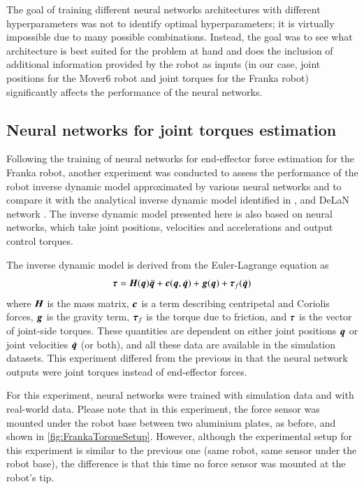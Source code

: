 The goal of training different neural networks architectures with different hyperparameters was not to identify optimal hyperparameters; it is virtually impossible due to many possible combinations. Instead, the goal was to see what architecture is best suited for the problem at hand and does the inclusion of additional information provided by the robot as inputs (in our case, joint positions for the Mover6 robot and joint torques for the Franka robot) significantly affects the performance of the neural networks.

\subsection{Neural networks for joint torques estimation}

Following the training of neural networks for end-effector force estimation for the Franka robot, another experiment was conducted to assess the performance of the robot inverse dynamic model approximated by various neural networks and to compare it with the analytical inverse dynamic model identified in \cite{Gaz2019}, and DeLaN network \cite{Lutter2019}. The inverse dynamic model presented here is also based on neural networks, which take joint positions, velocities and accelerations and output control torques.

The inverse dynamic model is derived from the Euler-Lagrange equation as
\[
    {\bm{\tau}}={\bm{H}}({\bm{q}})\ddot{{\bm{q}}}+{\bm{c}}({\bm{q}},\dot{{\bm{q}}})+{\bm{g}}({\bm{q}})+{\bm{\tau}}_f(\dot{{\bm{q}}})
    \label{eq:InvDyn}
\]
where ${\bm{H}}$ is the mass matrix, ${\bm{c}}$ is a term describing centripetal and Coriolis forces, ${\bm{g}}$ is the gravity term, ${\bm{\tau}}_f$ is the torque due to friction, and ${\bm{\tau}}$ is the vector of joint-side torques. These quantities are dependent on either joint positions ${\bm{q}}$ or joint velocities $\dot{{\bm{q}}}$ (or both), and all these data are available in the simulation datasets. This experiment differed from the previous in that the neural network outputs were joint torques instead of end-effector forces.

For this experiment, neural networks were trained with simulation data and with real-world data. Please note that in this experiment, the force sensor was mounted under the robot base between two aluminium plates, as before, and shown in \cref{fig:FrankaTorqueSetup}. However, although the experimental setup for this experiment is similar to the previous one (same robot, same sensor under the robot base), the difference is that this time no force sensor was mounted at the robot's tip.

